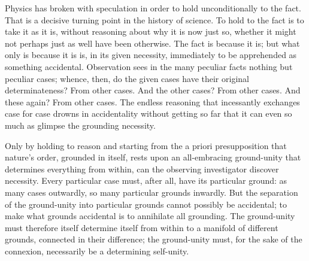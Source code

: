 \documentclass[12pt,a4paper]{book}
\begin{document}
Physics has broken with speculation in order to hold unconditionally to the fact. That is
a decisive turning point in the history of science. To hold to the fact is to take it as
it is, without reasoning about why it is now just so, whether it might not perhaps just
as well have been otherwise. The fact is because it is; but what only is because it is
is, in its given necessity, immediately to be apprehended as
something accidental. Observation sees in the many peculiar facts nothing but peculiar
cases; whence, then, do the given cases have their original determinateness? From other
cases. And the other cases? From other cases. And these again? From other cases. The
endless reasoning that incessantly exchanges case for case drowns in accidentality
without getting so far that it can even so much as glimpse the grounding necessity.

Only by holding to reason and starting from the a priori presupposition that nature's
order, grounded in itself, rests upon an all-embracing ground-unity that determines
everything from within, can the observing investigator discover necessity. Every
particular case must, after all, have its particular ground: as many cases outwardly, so
many particular grounds inwardly. But the separation of the ground-unity into particular
grounds cannot possibly be accidental; to make what grounds accidental is to annihilate
all grounding. The ground-unity must therefore itself determine itself from within to a
manifold of different grounds, connected in their
difference; the ground-unity must, for the sake of the connexion, necessarily be a
determining self-unity.
\end{document}
